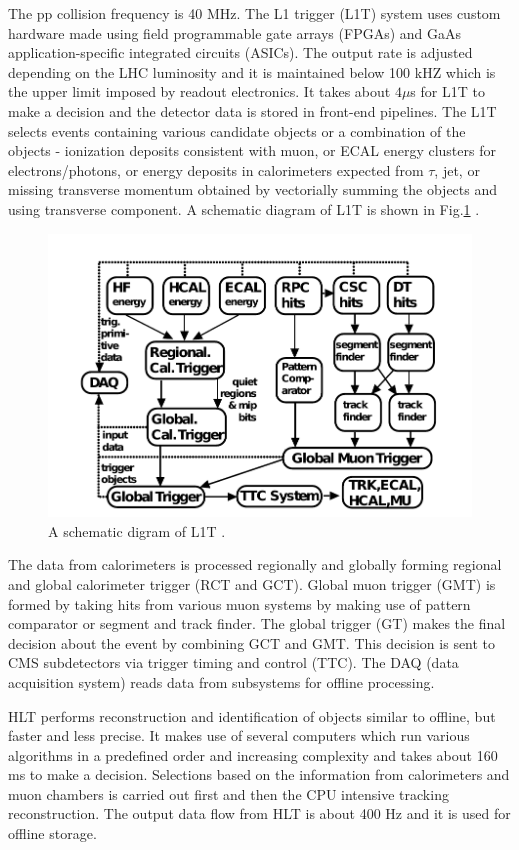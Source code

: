 The pp collision frequency is 40 MHz. The L1 trigger (L1T) system uses custom hardware made using field programmable gate arrays (FPGAs) 
and GaAs application-specific integrated circuits (ASICs). The output rate is adjusted depending on the LHC luminosity and it is 
maintained below 100 kHZ which is the upper limit imposed by readout electronics. It takes about $4\mu$s for L1T to make a decision and
the detector data is stored in front-end pipelines. The L1T selects events containing various candidate objects 
or a combination of the objects - ionization deposits consistent with muon, or ECAL energy clusters for electrons/photons, or energy 
deposits in calorimeters expected from $\tau$, jet, or missing transverse momentum obtained by vectorially summing the objects and using 
transverse component. A schematic diagram of L1T is shown in Fig.\ref{fig:L1Tsystem} \cite{Khachatryan:2016bia}.
\begin{figure}[h!]
\centering
\includegraphics[width=0.7\linewidth]{../Figures/Chap2/L1Tsystem}
\caption[Schematic of L1T]{A schematic digram of L1T \cite{Khachatryan:2016bia}.}
\label{fig:L1Tsystem}
\end{figure}
The data from calorimeters is processed regionally and globally forming regional and global calorimeter trigger (RCT and GCT). Global muon 
trigger (GMT) is formed by taking hits from various muon systems by making use of pattern comparator or segment and track finder. The 
global trigger (GT) makes the final decision about the event by combining GCT and GMT. This decision is sent to CMS subdetectors via 
trigger timing and control (TTC). The DAQ (data acquisition system) reads data from subsystems for offline processing.

HLT performs reconstruction and identification of objects similar to offline, but faster and less precise. It makes use of several 
computers which run various algorithms in a predefined order and increasing complexity and takes about 160 ms to make a decision. 
Selections based on the information from calorimeters and muon chambers is carried out first and then the CPU intensive tracking 
reconstruction. The output data flow from HLT is about 400 Hz and it is used for offline storage. 

